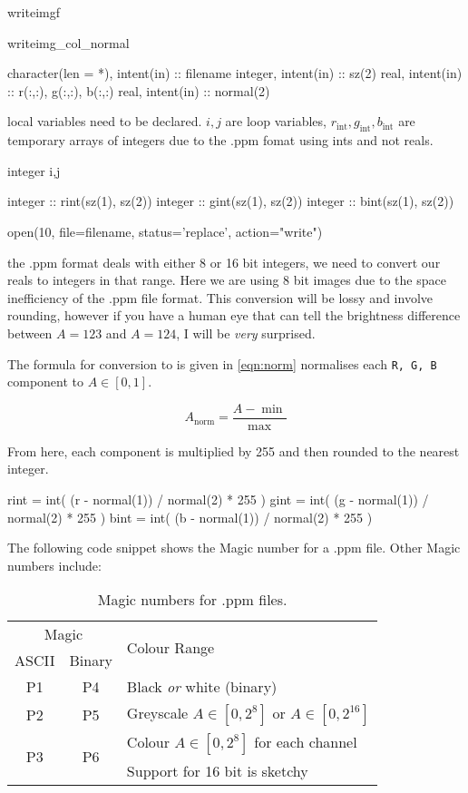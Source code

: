 \documentclass[a4paper]{article}
\begin{document}
\begin{codeblock}{writeimgf}
\begin{codeblock}{writeimg_col_normal}
\begin{code}
		character(len = *), intent(in) :: filename
		integer, intent(in) :: sz(2)
		real, intent(in) :: r(:,:), g(:,:), b(:,:)
		real, intent(in) :: normal(2)
\end{code}

local variables need to be declared. $i,j$ are loop variables, $r_\text{int}, g_\text{int}, b_\text{int}$ are temporary arrays of integers due to the .ppm fomat using ints and not reals. 

\begin{code}
		integer i,j
		
		integer :: rint(sz(1), sz(2))
		integer :: gint(sz(1), sz(2))
		integer :: bint(sz(1), sz(2))
		
		open(10, file=filename, status='replace', action="write") 
\end{code}

the .ppm format deals with either 8 or 16 bit integers, we need to convert our reals to integers in that range. Here we are using 8 bit images due to the space inefficiency of the .ppm file format. This conversion will be lossy and involve rounding, however if you have a human eye that can tell the brightness difference between $A=123$ and $A=124$, I will be \emph{very} surprised.

The formula for conversion to is given in \ref{eqn:norm} normalises each \texttt{R, G, B} component to $A\in[0,1]$.

\begin{equation}
A_\text{norm} = \frac{A - \min}{\max}
 \label{eqn:norm}
\end{equation}

From here, each component is multiplied by 255 and then rounded to the nearest integer.

\begin{code}
		rint = int( (r - normal(1)) / normal(2) * 255 )
		gint = int( (g - normal(1)) / normal(2) * 255 )
		bint = int( (b - normal(1)) / normal(2) * 255 )
\end{code}

The following code snippet shows the  Magic number for a .ppm file. Other Magic numbers include:

\begin{table}[hbt]
\centering
 \begin{tabular}{|c|c|l|}\hline
	\multicolumn{2}{|c|}{Magic} & \multirow{2}{*}{Colour Range} \\\cline{1-2}
	ASCII & Binary & \\\hline 
	P1 & P4 & Black \emph{or} white (binary) \\\hline
	P2 & P5 & Greyscale $A\in[0,2^8]$ or $A\in[0, 2^{16}]$\\\hline
	\multirow{2}{*}{P3} & \multirow{2}{*}{P6} & Colour $A\in[0,2^8]$ for each channel \\
	& & Support for 16 bit is sketchy\\\hline
 \end{tabular}
 \caption{Magic numbers for .ppm files\cite{davidsennetpbm}.}
\end{table}


\end{codeblock}
\end{codeblock}
\end{document}
